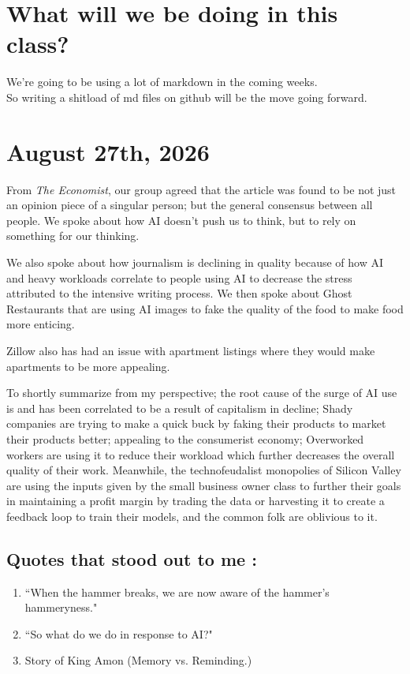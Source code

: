\documentclass{article}
\begin{document}
\section{What will we be doing in this class?}
We're going to be using a lot of markdown in the coming weeks. \\So writing a shitload
of md files on github will be the move going forward.

\section{August 27th, 2026}

From \textit{The Economist}, our group agreed that the article was found to be not just an opinion piece of
a singular person; but the general consensus between all people. We spoke about how AI doesn't push us to think,
but to rely on something for our thinking.

We also spoke about how journalism is declining in quality because of how AI and heavy workloads correlate to people using
AI to decrease the stress attributed to the intensive writing process. We then spoke about Ghost Restaurants that are using
AI images to fake the quality of the food to make food more enticing.

Zillow also has had an issue with apartment listings where they would make apartments to be more appealing.

To shortly summarize from my perspective; the root cause of the surge of AI use is and has been correlated to be a result 
of capitalism in decline; Shady companies are trying to make a quick buck by faking their products to market their products
better; appealing to the consumerist economy; Overworked workers are using it to reduce their workload which further decreases
the overall quality of their work. Meanwhile, the technofeudalist monopolies of Silicon Valley are using the inputs given
by the small business owner class to further their goals in maintaining a profit margin by trading the data or harvesting it to
create a feedback loop to train their models, and the common folk are oblivious to it.
\subsection{Quotes that stood out to me :}
  \begin{enumerate}
    \item ``When the hammer breaks, we are now aware of the hammer's hammery\-ness."
    \item ``So what do we do in response to AI?"
    \item Story of King Amon (Memory vs. Reminding.)
  \end{enumerate}
\end{document}
